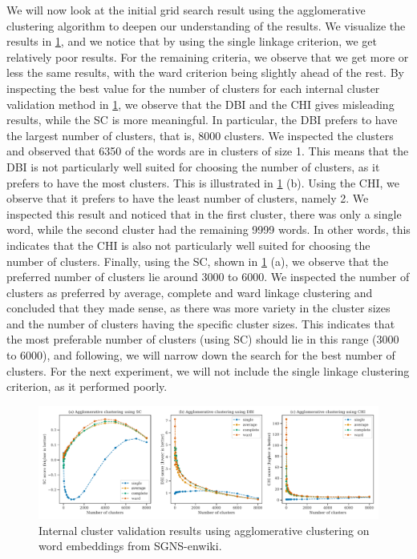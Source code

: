 We will now look at the initial grid search result using the agglomerative clustering algorithm to deepen our understanding of the results. We visualize the results in \cref{fig:cluster-analysis-agglomerative-internal-cluster-validation}, and we notice that by using the single linkage criterion, we get relatively poor results. For the remaining criteria, we observe that we get more or less the same results, with the ward criterion being slightly ahead of the rest. By inspecting the best value for the number of clusters for each internal cluster validation method in \cref{fig:cluster-analysis-agglomerative-internal-cluster-validation}, we observe that the DBI and the CHI gives misleading results, while the SC is more meaningful. In particular, the DBI prefers to have the largest number of clusters, that is, 8000 clusters. We inspected the clusters and observed that 6350 of the words are in clusters of size 1. This means that the DBI is not particularly well suited for choosing the number of clusters, as it prefers to have the most clusters. This is illustrated in \cref{fig:cluster-analysis-agglomerative-internal-cluster-validation} (b). Using the CHI, we observe that it prefers to have the least number of clusters, namely 2. We inspected this result and noticed that in the first cluster, there was only a single word, while the second cluster had the remaining 9999 words. In other words, this indicates that the CHI is also not particularly well suited for choosing the number of clusters. Finally, using the SC, shown in \cref{fig:cluster-analysis-agglomerative-internal-cluster-validation} (a), we observe that the preferred number of clusters lie around 3000 to 6000. We inspected the number of clusters as preferred by average, complete and ward linkage clustering and concluded that they made sense, as there was more variety in the cluster sizes and the number of clusters having the specific cluster sizes. This indicates that the most preferable number of clusters (using SC) should lie in this range (3000 to 6000), and following, we will narrow down the search for the best number of clusters. For the next experiment, we will not include the single linkage clustering criterion, as it performed poorly.
\begin{figure}[H]
    \centering
    \includegraphics[width=\textwidth]{thesis/figures/cluster-analysis-agglomerative-internal-cluster-validation.pdf}
    \caption{Internal cluster validation results using agglomerative clustering on word embeddings from SGNS-enwiki.}
    \label{fig:cluster-analysis-agglomerative-internal-cluster-validation}
\end{figure}

